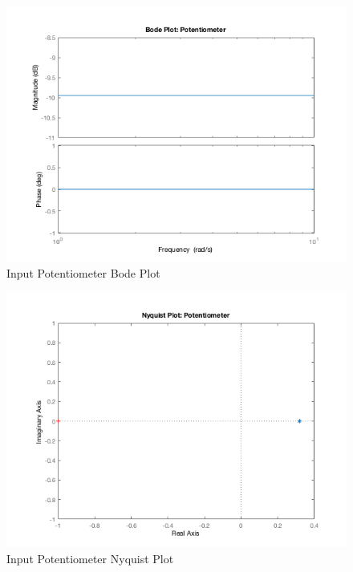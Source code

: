 \documentclass[12pt]{article}
\begin{document}
\begin{figure}[H]
\begin{center}
	\includegraphics[width=\textwidth]{./img/PotentiometerBode.png}
	\caption{\label{fig:potbode}Input Potentiometer Bode Plot}
\end{center}
\end{figure}

\begin{figure}[H]
\begin{center}
	\includegraphics[width=\textwidth]{./img/PotentiometerNyquist.png}
	\caption{\label{fig:potnyquist}Input Potentiometer Nyquist Plot}
\end{center}
\end{figure}
\end{document}
